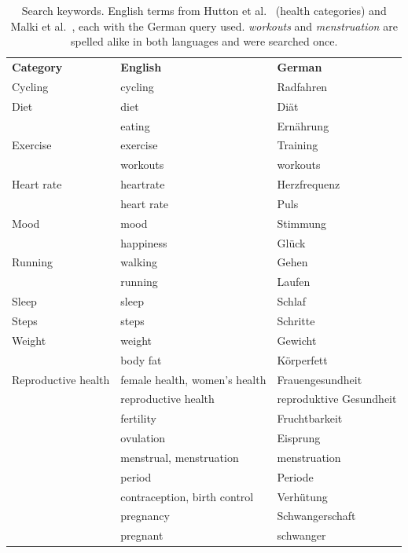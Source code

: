 \begin{table}[p]
\centering
\begin{singlespace}
\caption[Search keywords]{Search keywords. English terms from Hutton et
al.~\parencite[Table~2]{hutton2018assessing} (health categories) and Malki et
al.~\parencite[\S3.1]{malki2024exploring}, each with the German query used.
\emph{workouts} and \emph{menstruation} are spelled alike in both languages and
were searched once.}
\label{tab:keywords}
\small
\setlength{\aboverulesep}{0.25ex}\setlength{\belowrulesep}{0.35ex}
\begin{tabularx}{\textwidth}{@{}>{\raggedright\arraybackslash}p{3.2cm}>{\raggedright\arraybackslash}X>{\raggedright\arraybackslash}X@{}}
\toprule
 & \multicolumn{2}{c}{\textbf{Keywords}} \\
\cmidrule(lr){2-3}
\textbf{Category} & \textbf{English} & \textbf{German} \\
\midrule
Cycling & cycling & Radfahren \\
\addlinespace
Diet & diet & Diät \\
 & eating & Ernährung \\
\addlinespace
Exercise & exercise & Training \\
 & workouts & workouts \\
\addlinespace
Heart rate & heartrate & Herzfrequenz \\
 & heart rate & Puls \\
\addlinespace
Mood & mood & Stimmung \\
 & happiness & Glück \\
\addlinespace
Running & walking & Gehen \\
 & running & Laufen \\
\addlinespace
Sleep & sleep & Schlaf \\
\addlinespace
Steps & steps & Schritte \\
\addlinespace
Weight & weight & Gewicht \\
 & body fat & Körperfett \\
\midrule
Reproductive health & female health, women's health & Frauengesundheit \\
 & reproductive health & reproduktive Gesundheit \\
 & fertility & Fruchtbarkeit \\
 & ovulation & Eisprung \\
 & menstrual, menstruation & menstruation \\
 & period & Periode \\
 & contraception, birth control & Verhütung \\
 & pregnancy & Schwangerschaft \\
 & pregnant & schwanger \\
\bottomrule
\end{tabularx}


\end{singlespace}
\end{table}
